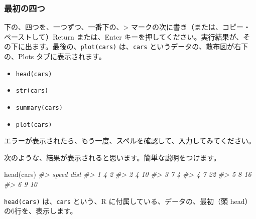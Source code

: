 \documentclass[
]{bxjsbook}
\newenvironment{Shaded}{\begin{snugshade}}{\end{snugshade}}
\newcommand{\CommentTok}[1]{\textcolor[rgb]{0.56,0.35,0.01}{\textit{#1}}}
\newcommand{\FunctionTok}[1]{\textcolor[rgb]{0.00,0.00,0.00}{#1}}
\newcommand{\NormalTok}[1]{#1}
\providecommand{\tightlist}{%
  \setlength{\itemsep}{0pt}\setlength{\parskip}{0pt}}
\theoremstyle{definition}
\theoremstyle{definition}
\theoremstyle{definition}
\theoremstyle{definition}
\theoremstyle{remark}
\begin{document}
\hypertarget{ux6700ux521dux306eux56dbux3064}{%
\subsubsection{最初の四つ}\label{ux6700ux521dux306eux56dbux3064}}

下の、四つを、一つずつ、一番下の、\textgreater{} マークの次に書き（または、コピー・ペーストして）Return または、Enter キーを押してください。実行結果が、その下に出ます。最後の、\texttt{plot(cars)} は、\texttt{cars} というデータの、散布図が右下の、Plots タブに表示されます。

\begin{itemize}
\tightlist
\item
  \texttt{head(cars)}
\item
  \texttt{str(cars)}
\item
  \texttt{summary(cars)}
\item
  \texttt{plot(cars)}
\end{itemize}

エラーが表示されたら、もう一度、スペルを確認して、入力してみてください。

次のような、結果が表示されると思います。簡単な説明をつけます。

\begin{Shaded}
\begin{Highlighting}[]
\FunctionTok{head}\NormalTok{(cars)}
\CommentTok{\#\textgreater{}   speed dist}
\CommentTok{\#\textgreater{} 1     4    2}
\CommentTok{\#\textgreater{} 2     4   10}
\CommentTok{\#\textgreater{} 3     7    4}
\CommentTok{\#\textgreater{} 4     7   22}
\CommentTok{\#\textgreater{} 5     8   16}
\CommentTok{\#\textgreater{} 6     9   10}
\end{Highlighting}
\end{Shaded}

\texttt{head(cars)} は、\texttt{cars} という、R に付属している、データの、最初（頭 head）の6行を、表示します。

\begin{Shaded}
\end{Shaded}
\end{document}
